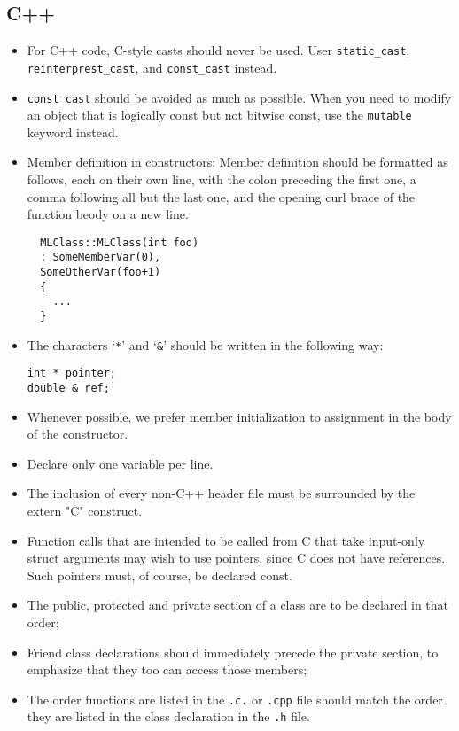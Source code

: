 \documentclass[10pt,letter,relax]{SANDreport}
\begin{document}
\subsection{C++}

\begin{itemize}
\item For C++ code, C-style casts should never be used. User
  \verb!static_cast!, \verb!reinterprest_cast!, and \verb!const_cast! instead.
\item \verb!const_cast! should be avoided as much as possible. When you need
to modify an object that is logically const but not bitwise const, use the
\verb!mutable! keyword instead.
\item Member definition in constructors: Member definition should be formatted
  as follows, each on their own line, with the colon preceding the first one,
a comma following all but the last one, and the opening curl brace of the
  function beody on a new line.
  \begin{verbatim}
  MLClass::MLClass(int foo)
  : SomeMemberVar(0),
  SomeOtherVar(foo+1)
  {
    ...
  }    
  \end{verbatim}
\item The characters `\verb!*!' and `\verb!&!' should be
written in the following way:
\begin{verbatim}
int * pointer;
double & ref;
\end{verbatim}
\item Whenever possible, we prefer member initialization to assignment in the
  body of the constructor.
\item Declare only one variable per line.
\item The inclusion of every non-C++ header file must be surrounded by
  the extern "C" { } construct.
\item Function calls that are intended to be called from C that take input-only struct arguments may wish to use pointers, since C does not have references. Such pointers must, of course, be declared const.
\item The public, protected and private section of a class are to be declared
  in that order;
\item Friend class declarations should immediately precede the private
  section, to emphasize that they too can access those members;
\item The order functions are listed in the \verb!.c.! or \verb!.cpp! file
  should match the order they are listed in the class declaration in the
  \verb!.h! file.
\end{itemize}
\end{document}
